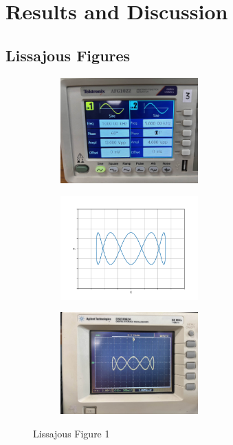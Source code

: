 \documentclass[a4paper,12pt]{article}
\begin{document}
\section*{Results and Discussion}
\subsection*{Lissajous Figures}

\begin{figure}[h!]
	\begin{subfigure}[b]{10pt}
		\includegraphics[width = 150pt]{figs/fig1.jpeg}
	\end{subfigure}
	\hspace{120pt}
	\begin{subfigure}[b]{10pt}
		\includegraphics[width = 150pt]{figs/fig1.png}
	\end{subfigure}
	\hspace{130pt}
	\begin{subfigure}[b]{10pt}
		\includegraphics[width = 150pt]{figs/fig1_1.jpeg}
	\end{subfigure}
	\caption{Lissajous Figure 1}
\end{figure}
\pagebreak
\end{document}
